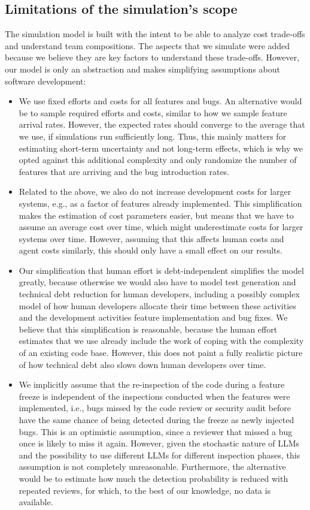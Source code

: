 \documentclass[smallextended]{svjour3}       %
\begin{document}
\subsection{Limitations of the simulation's scope}
\label{sec:model:limitations}

The simulation model is built with the intent to be able to analyze cost trade-offs and understand team compositions. The aspects that we simulate were added because we believe they are key factors to understand these trade-offs. However, our model is only an abstraction and makes simplifying assumptions about software development:
\begin{itemize}
  \item We use fixed efforts and costs for all features and bugs. An alternative would be to sample required efforts and costs, similar to how we sample feature arrival rates. However, the expected rates should converge to the average that we use, if simulations run sufficiently long. Thus, this mainly matters for estimating short-term uncertainty and not long-term effects, which is why we opted against this additional complexity and only randomize the number of features that are arriving and the bug introduction rates. 
  \item Related to the above, we also do not increase development costs for larger systems, e.g., as a factor of features already implemented. This simplification makes the estimation of cost parameters easier, but means that we have to assume an average cost over time, which might underestimate costs for larger systems over time. However, assuming that this affects human costs and agent costs similarly, this should only have a small effect on our results. 
  \item Our simplification that human effort is debt-independent simplifies the model greatly, because otherwise we would also have to model test generation and technical debt reduction for human developers, including a possibly complex model of how human developers allocate their time between these activities and the development activities feature implementation and bug fixes. We believe that this simplification is reasonable, because the human effort estimates that we use already include the work of coping with the complexity of an existing code base. However, this does not paint a fully realistic picture of how technical debt also slows down human developers over time. 
  \item We implicitly assume that the re-inspection of the code during a feature freeze is independent of the inspections conducted when the features were implemented, i.e., bugs missed by the code review or security audit before have the same chance of being detected during the freeze as newly injected bugs. This is an optimistic assumption, since a reviewer that missed a bug once is likely to miss it again. However, given the stochastic nature of LLMs and the possibility to use different LLMs for different inspection phases, this assumption is not completely unreasonable. Furthermore, the alternative would be to estimate how much the detection probability is reduced with repeated reviews, for which, to the best of our knowledge, no data is available.
\end{itemize}
\end{document}
